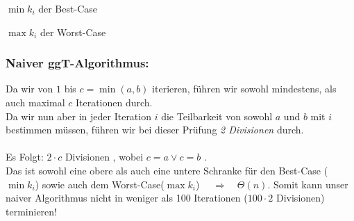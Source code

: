 \documentclass{llncs}
\begin{document}
$\min k_i$ der Best-Case

$\max k_i$ der Worst-Case
\subsubsection*{Naiver ggT-Algorithmus:}
Da wir von $1$ bis $c=\min(a,b)$ iterieren, führen wir sowohl mindestens, als auch maximal $c$ Iterationen durch.\\
Da wir nun aber in jeder Iteration $i$ die Teilbarkeit von sowohl $a$ und $b$ mit $i$ bestimmen müssen, führen wir bei dieser Prüfung \textit{2 Divisionen} durch.\\\\
Es Folgt: $2 \cdot c$ Divisionen , wobei $c=a \vee c=b$ .\\
Das ist sowohl eine obere als auch eine untere Schranke für den Best-Case ($\min k_i$) sowie auch dem Worst-Case($\max k_i$) $\quad \Rightarrow \quad \Theta(n)$.
Somit kann unser naiver Algorithmus nicht in weniger als 100 Iterationen ($100\cdot 2$ Divisionen) terminieren!
\end{document}
